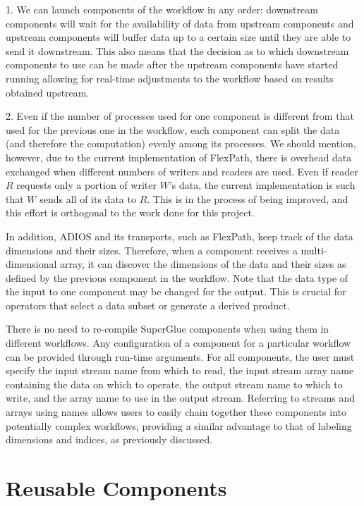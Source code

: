\documentclass[conference]{IEEEtran}
\begin{document}
1. We can launch components of the workflow in any order: downstream components
will wait for the availability of data from upstream components and upstream
components will buffer data up to a certain size until they are able to send it
downstream. This also means that the decision as to which downstream
components to use can be made after the upstream components have started
running allowing for real-time adjustments to the workflow based on results
obtained upstream.

2. Even if the number of processes used for one component is different from that
used for the previous one in the workflow, each component can split the data
(and therefore the computation) evenly among its processes. We should mention,
however, due to the current implementation of FlexPath, there is overhead
data exchanged when different numbers of writers and readers are used. Even if
reader $R$ requests only a portion of writer $W$'s data, the current implementation
is such that $W$ sends all of its data to $R$. This is in the process of being
improved, and this effort is orthogonal to the work done for this project.

In addition, ADIOS and its transports, such as FlexPath, keep track of the
data dimensions and their sizes. Therefore, when a component receives a
multi-dimensional array, it can discover the dimensions of the data and their
sizes as defined by the previous component in the workflow. Note that the
data type of the input to one component may be changed for the output. This is
crucial for operators that select a data subset or generate a derived product.

There is no need to re-compile SuperGlue components when using them
in different workflows. Any configuration of a component for a particular workflow
can be provided through run-time arguments.
For all components, the user must specify the input stream name from
which to read, the input stream array name containing the data on which to operate,
the output stream name to which to
write, and the array name to use in the output stream. Referring to
streams and arrays using names allows users to easily chain together these
components into potentially complex workflows, providing a similar advantage
to that of labeling dimensions and indices, as previously discussed.

\section{Reusable Components}
\label{s:reusable-components}
\end{document}
